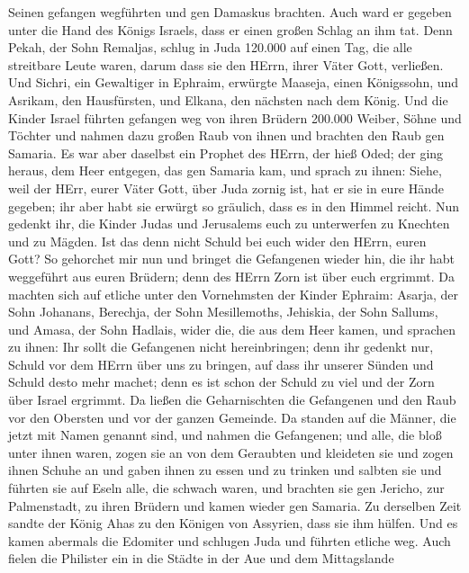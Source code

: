 Seinen gefangen wegführten und gen Damaskus brachten. Auch ward er
gegeben unter die Hand des Königs Israels, dass er einen großen Schlag
an ihm tat.  Denn Pekah, der Sohn Remaljas, schlug in Juda
120.000 auf einen Tag, die alle streitbare Leute waren, darum dass sie
den HErrn, ihrer Väter Gott, verließen.  Und Sichri, ein
Gewaltiger in Ephraim, erwürgte Maaseja, einen Königssohn, und Asrikam,
den Hausfürsten, und Elkana, den nächsten nach dem König. 
Und die Kinder Israel führten gefangen weg von ihren Brüdern 200.000
Weiber, Söhne und Töchter und nahmen dazu großen Raub von ihnen und
brachten den Raub gen Samaria.  Es war aber daselbst ein
Prophet des HErrn, der hieß Oded; der ging heraus, dem Heer entgegen,
das gen Samaria kam, und sprach zu ihnen: Siehe, weil der HErr, eurer
Väter Gott, über Juda zornig ist, hat er sie in eure Hände gegeben; ihr
aber habt sie erwürgt so gräulich, dass es in den Himmel reicht.
 Nun gedenkt ihr, die Kinder Judas und Jerusalems euch zu
unterwerfen zu Knechten und zu Mägden. Ist das denn nicht Schuld bei
euch wider den HErrn, euren Gott?  So gehorchet mir nun und
bringet die Gefangenen wieder hin, die ihr habt weggeführt aus euren
Brüdern; denn des HErrn Zorn ist über euch ergrimmt.  Da
machten sich auf etliche unter den Vornehmsten der Kinder Ephraim:
Asarja, der Sohn Johanans, Berechja, der Sohn Mesillemoths, Jehiskia,
der Sohn Sallums, und Amasa, der Sohn Hadlais, wider die, die aus dem
Heer kamen,  und sprachen zu ihnen: Ihr sollt die
Gefangenen nicht hereinbringen; denn ihr gedenkt nur, Schuld vor dem
HErrn über uns zu bringen, auf dass ihr unserer Sünden und Schuld desto
mehr machet; denn es ist schon der Schuld zu viel und der Zorn über
Israel ergrimmt.  Da ließen die Geharnischten die
Gefangenen und den Raub vor den Obersten und vor der ganzen Gemeinde.
 Da standen auf die Männer, die jetzt mit Namen genannt
sind, und nahmen die Gefangenen; und alle, die bloß unter ihnen waren,
zogen sie an von dem Geraubten und kleideten sie und zogen ihnen Schuhe
an und gaben ihnen zu essen und zu trinken und salbten sie und führten
sie auf Eseln alle, die schwach waren, und brachten sie gen Jericho, zur
Palmenstadt, zu ihren Brüdern und kamen wieder gen Samaria.
 Zu derselben Zeit sandte der König Ahas zu den Königen von
Assyrien, dass sie ihm hülfen.  Und es kamen abermals die
Edomiter und schlugen Juda und führten etliche weg.  Auch
fielen die Philister ein in die Städte in der Aue und dem Mittagslande
